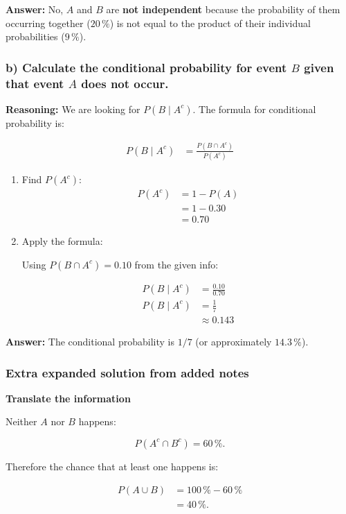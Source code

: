 \documentclass[10pt]{article}
\begin{document}
\textbf{Answer:}
No, $A$ and $B$ are \textbf{not independent} because the
probability of them occurring together ($20\,\%$) is not equal
to the product of their individual probabilities ($9\,\%$).

\subsubsection*{b) Calculate the conditional probability for event $B$ given that event $A$ does not occur.}
\textbf{Reasoning:}
We are looking for $P(B\mid A^c)$.
The formula for conditional probability is:

\begin{align*}
P(B\mid A^c)
&= \frac{P(B \cap A^c)}{P(A^c)}
\end{align*}

\begin{enumerate}
\item Find $P(A^c)$:
\begin{align*}
P(A^c)
&= 1-P(A) \\[2mm]
&= 1-0.30 \\[2mm]
&= 0.70
\end{align*}

\item Apply the formula:

Using $P(B \cap A^c)=0.10$ from the given info:

\begin{align*}
P(B\mid A^c)
&= \frac{0.10}{0.70} \\[2mm]
P(B\mid A^c)
&= \frac{1}{7} \\[2mm]
&\approx 0.143
\end{align*}
\end{enumerate}

\textbf{Answer:}
The conditional probability is $1/7$
(or approximately $14.3\,\%$).

\subsubsection*{Extra expanded solution from added notes}

\textbf{Translate the information}

Neither $A$ nor $B$ happens:

\[
P(A^c\cap B^c)=60\,\%.
\]

Therefore the chance that at least one happens is:

\begin{align*}
P(A\cup B)
&=100\,\%-60\,\% \\[2mm]
&=40\,\%.
\end{align*}
\end{document}
